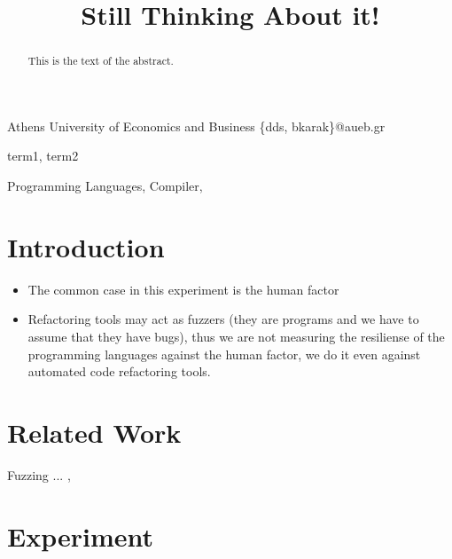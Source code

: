 \documentclass[10pt]{sigplanconf}
\begin{document}
\copyrightdata{[to be supplied]}


\title{Still Thinking About it!}

           {Athens University of Economics and Business}
           {\{dds, bkarak\}@aueb.gr}

\maketitle

\begin{abstract}
This is the text of the abstract.
\end{abstract}


\terms
term1, term2

\keywords
Programming Languages, Compiler,

\section{Introduction}

\cite{C99}

\begin{itemize}
	\item The common case in this experiment is the human factor
	\item Refactoring tools may act as fuzzers (they are programs and we have to assume that they have bugs), thus we are not measuring the resiliense of the programming languages against the human factor, we do it even against automated code refactoring tools.
\end{itemize}

\section{Related Work}

Fuzzing ... \cite{TJC08}, \cite{WWGZ11}

\section{Experiment}
\end{document}
